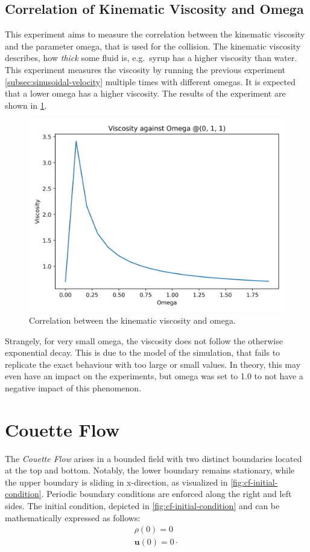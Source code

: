 \subsection{Correlation of Kinematic Viscosity and Omega}
This experiment aims to measure the correlation between the kinematic viscosity and the parameter omega, that is used for the collision.
The kinematic viscosity describes, how \textit{thick} some fluid is, e.g.\ syrup has a higher viscosity than water. %
This experiment measures the viscosity by running the previous experiment \cref{subsec:sinusoidal-velocity} multiple times with different omegas.
It is expected that a lower omega has a higher viscosity. %
The results of the experiment are shown in \cref{fig:swd-vo-viscosity-vs-omega}.

\begin{figure}[H]
    \begin{center}
        \includegraphics[width=0.5\linewidth]{graphs/ShearWaveDecay/Viscosity/viscosity_against_omega}
        \caption{Correlation between the kinematic viscosity and omega.}
        \label{fig:swd-vo-viscosity-vs-omega}
    \end{center}
\end{figure}

Strangely, for very small omega, the viscosity does not follow the otherwise exponential decay.
This is due to the model of the simulation, that fails to replicate the exact behaviour with too large or small values. %
In theory, this may even have an impact on the experiments, but omega was set to 1.0 to not have a negative impact of this phenomenon.


\section{Couette Flow}\label{sec:couette-flow}
The \textit{Couette Flow} arises in a bounded field with two distinct boundaries located at the top and bottom.
Notably, the lower boundary remains stationary, while the upper boundary is sliding in x-direction, as visualized in \cref{fig:cf-initial-condition}.
Periodic boundary conditions are enforced along the right and left sides.
The initial condition, depicted in \cref{fig:cf-initial-condition} and can be mathematically expressed as follows:
\begin{equation*}
    \begin{aligned}
        \rho(0) = 0 \\
        \mathbf{u}(0) = 0 \cdot
    \end{aligned}
\end{equation*}

